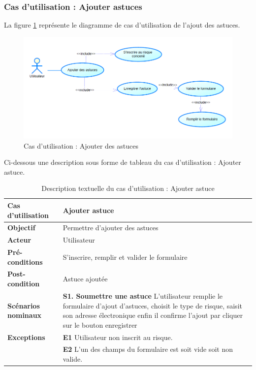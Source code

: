 \subsubsection{Cas d'utilisation : Ajouter astuces}

\qquad La figure \ref{fig2.2} représente le diagramme de cas d'utilisation de l'ajout des astuces.

\begin{figure}[!h]
	\begin{center}
		\includegraphics[width=0.64\textheight]{figures/uc_ajoutastuce}
	\end{center}
	\caption{Cas d'utilisation : Ajouter des astuces}
	\label{fig2.2}
\end{figure}

Ci-dessous une description sous forme de tableau du cas d'utilisation : Ajouter astuce.

\begin{table}[!h]
	\caption{Description textuelle du cas d'utilisation : Ajouter astuce}
	\begin{center}
		\begin{tabular}{|L{4cm}|L{10cm}|}
			\hline
			\textbf{Cas d’utilisation} & Ajouter astuce\\
			\hline
			\textbf{Objectif} & Permettre d'ajouter des astuces\\
			\hline
			\textbf{Acteur} & Utilisateur\\
			\hline
			\textbf{Pré-conditions} & S'inscrire, remplir et valider le formulaire\\
			\hline
			\textbf{Post-condition} & Astuce ajoutée\\
			\hline			
			\textbf{Scénarios nominaux} & \textbf{S1. Soumettre une astuce} L'utilisateur remplie le formulaire d'ajout d'astuces, choisit le type de risque, saisit son adresse électronique enfin il confirme l'ajout par cliquer sur le bouton enregistrer\\
			\hline
			\textbf{Exceptions} & \textbf{E1} Utilisateur non inscrit au risque.\\ &\textbf{E2} L'un des champs du formulaire est soit vide soit non valide.\\
			\hline
		\end{tabular}
	\end{center}
\end{table}

